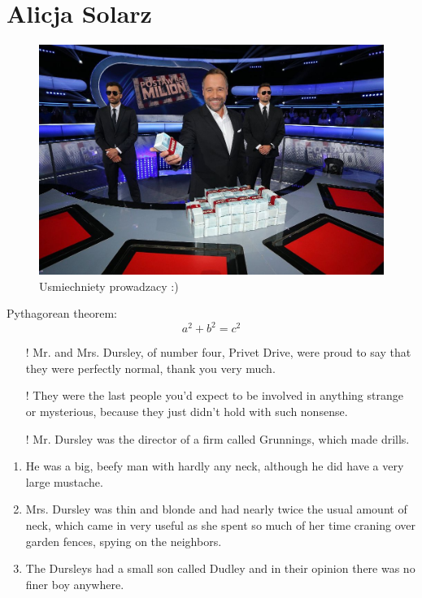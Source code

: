 \section{Alicja Solarz}


\begin{figure}[htbp] 
    \centering
   \includegraphics[width=1\textwidth]{pictures/postaw_na_milion.jpg}
    \caption{Usmiechniety prowadzacy :)}
    \label{fig:postaw na milion!}
\end{figure}



Pythagorean theorem:
\[ a^2 + b^2 = c^2 \]

\begin{itemize}
  \item[!]  Mr. and Mrs. Dursley, of number four, Privet Drive, were
proud to say that they were perfectly normal, thank
you very much.
  \item[!]  They were the last people you’d expect to be involved in anything strange or mysterious, because they just didn’t hold with such nonsense.
  \item[!] Mr. Dursley was the director of a firm called Grunnings, which
made drills.
\end{itemize}

\begin{enumerate}
  \item  He was a big, beefy man with hardly any neck, although he did have a very large mustache. 
  \item Mrs. Dursley was thin
and blonde and had nearly twice the usual amount of neck, which
came in very useful as she spent so much of her time craning over
garden fences, spying on the neighbors.
  \item The Dursleys had a small
son called Dudley and in their opinion there was no finer boy
anywhere.

\end{enumerate}

